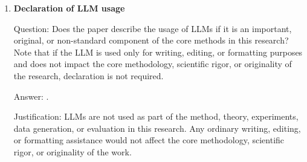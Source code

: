 \documentclass{article}
\theoremstyle{plain}
\theoremstyle{definition}
\theoremstyle{remark}
\begin{document}
\begin{enumerate}[leftmargin=5mm]
\item \textbf{Declaration of LLM usage}

Question: Does the paper describe the usage of LLMs if it is an important,
original, or non-standard component of the core methods in this research? Note
that if the LLM is used only for writing, editing, or formatting purposes and
does not impact the core methodology, scientific rigor, or originality of the
research, declaration is not required.

Answer: \answerNA{}.

Justification: LLMs are not used as part of the method, theory, experiments,
data generation, or evaluation in this research. Any ordinary writing, editing,
or formatting assistance would not affect the core methodology, scientific
rigor, or originality of the work.
\end{enumerate}
\end{document}
